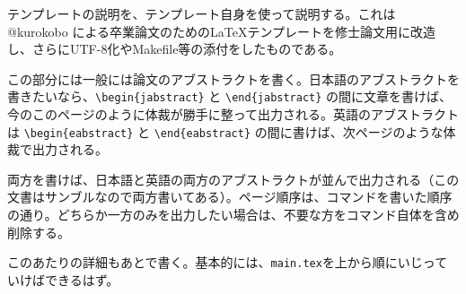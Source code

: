 


\begin{jabstract}

テンプレートの説明を、テンプレート自身を使って説明する。これは @kurokobo による卒業論文のための\LaTeX テンプレートを修士論文用に改造し、さらにUTF-8化やMakefile等の添付をしたものである。

この部分には一般には論文のアブストラクトを書く。日本語のアブストラクトを書きたいなら、\verb|\begin{jabstract}| と \verb|\end{jabstract}| の間に文章を書けば、今のこのページのように体裁が勝手に整って出力される。英語のアブストラクトは \verb|\begin{eabstract}| と \verb|\end{eabstract}| の間に書けば、次ページのような体裁で出力される。

両方を書けば、日本語と英語の両方のアブストラクトが並んで出力される（この文書はサンブルなので両方書いてある）。ページ順序は、コマンドを書いた順序の通り。どちらか一方のみを出力したい場合は、不要な方をコマンド自体を含め削除する。

このあたりの詳細もあとで書く。基本的には、{\tt main.tex}を上から順にいじっていけばできるはず。

\end{jabstract}
